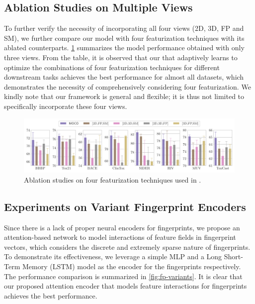 \subsection{Ablation Studies on Multiple Views}
\label{supp:more-ablation}

To further verify the necessity of incorporating all four views (2D, 3D, FP and SM), we further compare our \themodel model with four featurization techniques with its ablated counterparts. \cref{fig:view-ablation} summarizes the model performance obtained with only three views.
From the table, it is observed that our \themodel that adaptively learns to optimize the combinations of four featurization techniques for different downstream tasks achieves the best performance for almost all datasets, which demonstrates the necessity of comprehensively considering four featurization.
We kindly note that our framework is general and flexible; it is thus not limited to specifically incorporate these four views.

\begin{figure}
	\centering
	\includegraphics[width=\linewidth]{figures/ablation2.pdf}
	\caption{Ablation studies on four featurization techniques used in \themodel.}
	\label{fig:view-ablation}
\end{figure}

\subsection{Experiments on Variant Fingerprint Encoders}

Since there is a lack of proper neural encoders for fingerprints, we propose an attention-based network to model interactions of feature fields in fingerprint vectors, which considers the discrete and extremely sparse nature of fingerprints.
To demonstrate its effectiveness, we leverage a simple MLP and a Long Short-Term Memory (LSTM) model as the encoder for the fingerprints respectively.
The performance comparison is summarized in \cref{fig:fp-variants}. It is clear that our proposed attention encoder that models feature interactions for fingerprints achieves the best performance.

